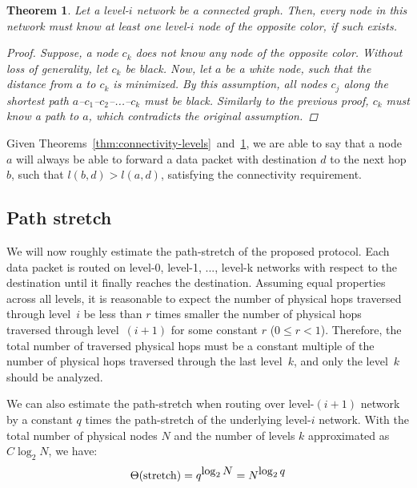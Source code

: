 \documentclass[conference]{IEEEtran}
\newtheorem{thm}{Theorem}
\theoremstyle{definition}
\begin{document}
\begin{thm}
    Let a level-$i$ network be a connected graph. Then, every node in this network must know at least one level-$i$ node of the opposite color, if such exists.

    \begin{proof}
        Suppose, a node $c_k$ does not know any node of the opposite color. Without loss of generality, let $c_k$ be black. Now, let $a$ be a white node, such that the distance from $a$ to $c_k$ is minimized. By this assumption, all nodes $c_j$ along the shortest path $a$--$c_1$--$c_2$--...--$c_k$ must be black. Similarly to the previous proof, $c_k$ must know a path to $a$, which contradicts the original assumption.
    \end{proof}

    \label{thm:connectivity-colors}
\end{thm}

Given Theorems~\ref{thm:connectivity-levels}~and~\ref{thm:connectivity-colors}, we are able to say that a node $a$ will always be able to forward a data packet with destination $d$ to the next hop $b$, such that $l(b,d) > l(a,d)$, satisfying the connectivity requirement.


\subsection{Path stretch}
\label{sec:analysis:stretch}

We will now roughly estimate the path-stretch of the proposed protocol. Each data packet is routed on level-0, level-1, ..., level-k networks with respect to the destination until it finally reaches the destination. Assuming equal properties across all levels, it is reasonable to expect the number of physical hops traversed through level~$i$ be less than $r$ times smaller the number of physical hops traversed through level~$(i+1)$ for some constant $r$ ($0 \le r < 1$). Therefore, the total number of traversed physical hops must be a constant multiple of the number of physical hops traversed through the last level~$k$, and only the level~$k$ should be analyzed.

We can also estimate the path-stretch when routing over level-$(i+1)$ network by a constant $q$ times the path-stretch of the underlying level-$i$ network. With the total number of physical nodes $N$ and the number of levels $k$ approximated as $C\log_2 N$, we have:
\begin{equation*}
    \Theta({\rm stretch}) = q^{\displaystyle \log_2 N} = N^{\displaystyle \log_2 q}
\end{equation*}
\end{document}
